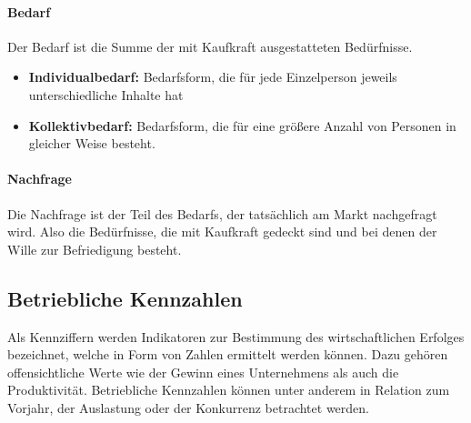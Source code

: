 	
	\paragraph{Bedarf}
	Der Bedarf ist die Summe der mit Kaufkraft ausgestatteten Bedürfnisse.
		\begin{itemize}
			\item \textbf{Individualbedarf:} Bedarfsform, die für jede Einzelperson jeweils unterschiedliche Inhalte hat
			\item \textbf{Kollektivbedarf:} Bedarfsform, die für eine größere Anzahl von Personen in gleicher Weise besteht.
		\end{itemize}
	
	\paragraph{Nachfrage}
	Die Nachfrage ist der Teil des Bedarfs, der tatsächlich am Markt nachgefragt wird. Also die Bedürfnisse, die mit Kaufkraft gedeckt sind und bei denen der Wille zur Befriedigung besteht.
	

\subsection{Betriebliche Kennzahlen}

Als Kennziffern werden Indikatoren zur Bestimmung des wirtschaftlichen Erfolges bezeichnet, welche in Form von Zahlen ermittelt werden können. Dazu gehören offensichtliche Werte wie der Gewinn eines Unternehmens als auch die Produktivität. Betriebliche Kennzahlen können unter anderem in Relation zum Vorjahr, der Auslastung oder der Konkurrenz betrachtet werden.\\



